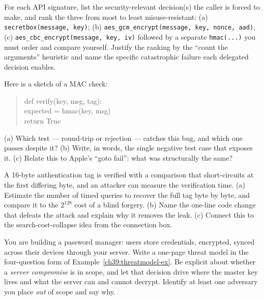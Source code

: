 \begin{exercise}
For each API signature, list the security-relevant decision(s) the caller is forced
to make, and rank the three from most to least misuse-resistant:
(a) \texttt{secretbox(message, key)};
(b) \texttt{aes\_gcm\_encrypt(message, key, nonce, aad)};
(c) \texttt{aes\_cbc\_encrypt(message, key, iv)} followed by a separate
\texttt{hmac(...)} you must order and compare yourself. Justify the ranking by the
``count the arguments'' heuristic and name the specific catastrophic failure each
delegated decision enables.
\end{exercise}

\begin{exercise}
Here is a sketch of a MAC check:
\begin{quote}\ttfamily
def verify(key, msg, tag):\\
\hspace*{2em}expected = hmac(key, msg)\\
\hspace*{2em}return True
\end{quote}
(a) Which test --- round-trip or rejection --- catches this bug, and which one
passes despite it? (b) Write, in words, the single negative test case that exposes
it. (c) Relate this to Apple's ``goto fail'': what was structurally the same?
\end{exercise}

\begin{exercise}
A 16-byte authentication tag is verified with a comparison that short-circuits at
the first differing byte, and an attacker can measure the verification time. (a)
Estimate the number of timed queries to recover the full tag byte by byte, and
compare it to the $2^{128}$ cost of a blind forgery. (b) Name the one-line code
change that defeats the attack and explain why it removes the leak. (c) Connect
this to the search-cost-collapse idea from the connection box.
\end{exercise}

\begin{exercise}
You are building a password manager: users store credentials, encrypted, synced
across their devices through your server. Write a one-page threat model in the
four-question form of Example~\ref{ch39:threatmodel-ex}. Be explicit about whether
a \emph{server compromise} is in scope, and let that decision drive where the
master key lives and what the server can and cannot decrypt. Identify at least one
adversary you place \emph{out} of scope and say why.
\end{exercise}

